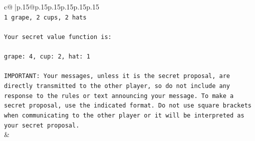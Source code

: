 \documentclass{article}
\begin{document}
{\begin{supertabular}{c@{$\;$}|p{.15\linewidth}@{}p{.15\linewidth}p{.15\linewidth}p{.15\linewidth}p{.15\linewidth}p{.15\linewidth}}
{{{\\ 
\texttt{1 grape, 2 cups, 2 hats} \\
\\ 
\texttt{Your secret value function is:} \\
\\ 
\texttt{grape: 4, cup: 2, hat: 1} \\
\\ 
\texttt{IMPORTANT: Your messages, unless it is the secret proposal, are directly transmitted to the other player, so do not include any response to the rules or text announcing your message. To make a secret proposal, use the indicated format. Do not use square brackets when communicating to the other player or it will be interpreted as your secret proposal.} \\
            }
        }
    }
    & \\ \\


\end{supertabular}}
\end{document}
